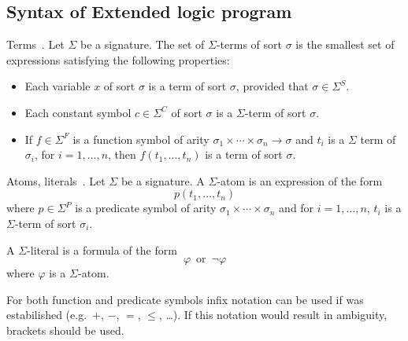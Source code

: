 \subsection{Syntax of Extended logic program}

\begin{definition}{Terms~\cite{zarba2006}.}
    Let $\Sigma$ be a signature. The set of $\Sigma$-terms of sort $\sigma$
    is the smallest set of expressions satisfying the following properties:
    \begin{itemize}
        \item Each variable $x$ of sort $\sigma$ is a term of sort $\sigma$, provided that $\sigma\in \Sigma^S$.
        \item Each constant symbol $c\in \Sigma^C$ of sort $\sigma$ is a $\Sigma$-term of sort $\sigma$.
        \item If $f\in \Sigma^F$ is a function symbol of arity $\sigma_1\times\cdots\times \sigma_n\to \sigma$
            and $t_i$ is a $\Sigma$ term of $\sigma_i$, for $i=1,\ldots, n$, then $f(t_1,\ldots,t_n)$ is a term of sort $\sigma$.
    \end{itemize}
\end{definition}

\begin{definition}{Atoms, literals~\cite{zarba2006}.}
    Let $\Sigma$ be a signature.
    A $\Sigma$-atom is an expression of the form
    \begin{equation*}
        p(t_1, \ldots, t_n)
    \end{equation*}
    where $p\in \Sigma^P$ is a predicate symbol of arity $\sigma_1\times\cdots\times\sigma_n$
    and for $i=1,\ldots,n$, $t_i$ is a $\Sigma$-term of sort $\sigma_i$.

    A $\Sigma$-literal is a formula of the form
    \begin{equation*}
        \varphi\, \text{ or } \,\neg\varphi
    \end{equation*}
    where $\varphi$ is a $\Sigma$-atom.
\end{definition}

For both function and predicate symbols infix notation can be used if was estabilished
(e.g.\ $+$, $-$, $=$, $\leq$, \ldots). If this notation would result in ambiguity, brackets should be used.

